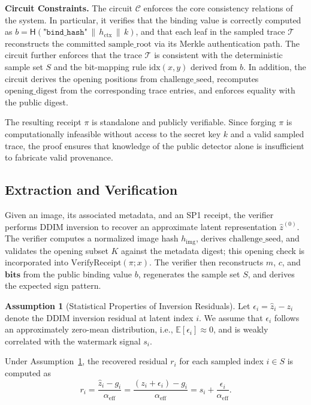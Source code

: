 \documentclass{article}
\theoremstyle{plain}
\theoremstyle{definition}
\newtheorem{assumption}[theorem]{Assumption}
\theoremstyle{remark}
\begin{document}
\textbf{Circuit Constraints.}
The circuit \(\mathcal{C}\) enforces the core consistency relations of the system. In
particular, it verifies that the binding value is correctly computed as
\(b = \mathsf{H}(\texttt{"bind\_hash"} \,\|\, h_{\mathrm{ctx}} \,\|\, k)\), and that each
leaf in the sampled trace \(\mathcal{T}\) reconstructs the committed
\(\mathrm{sample\_root}\) via its Merkle authentication path. The circuit further enforces
that the trace \(\mathcal{T}\) is consistent with the deterministic sample set \(S\) and the
bit-mapping rule \(\mathrm{idx}(x,y)\) derived from \(b\). In addition, the circuit derives the opening positions from \(\mathrm{challenge\_seed}\), recomputes \(\mathrm{opening\_digest}\) from the corresponding trace entries, and enforces equality with the public digest.

The resulting receipt \(\pi\) is standalone and publicly verifiable. Since forging \(\pi\) is computationally infeasible without access to the secret key \(k\) and a valid sampled trace, the proof ensures that knowledge of the public detector alone is insufficient to fabricate valid provenance.

\subsection{Extraction and Verification}
Given an image, its associated metadata, and an SP1 receipt, the verifier performs DDIM
inversion to recover an approximate latent representation \(\hat{z}^{(0)}\). The verifier
computes a normalized image hash \(h_{\mathrm{img}}\), derives
\(\mathrm{challenge\_seed}\), and validates the opening subset \(K\) against the metadata
digest; this opening check is incorporated into
\(\text{VerifyReceipt}(\pi; x)\). The verifier then reconstructs \(m\), \(c\), and
\(\mathbf{bits}\) from the public binding value \(b\), regenerates the sample set \(S\), and
derives the expected sign pattern.

\begin{assumption}[Statistical Properties of Inversion Residuals]
\label{assum:noise}
Let \(\epsilon_i = \hat{z}_i - z_i\) denote the DDIM inversion residual at latent index \(i\).
We assume that \(\epsilon_i\) follows an approximately zero-mean distribution, i.e.,
\(\mathbb{E}[\epsilon_i] \approx 0\), and is weakly correlated with the watermark signal
\(s_i\).
\end{assumption}

Under Assumption~\ref{assum:noise}, the recovered residual \(r_i\) for each sampled index
\(i \in S\) is computed as
\begin{equation}
r_i
= \frac{\hat{z}_i - g_i}{\alpha_{\mathrm{eff}}}
= \frac{(z_i + \epsilon_i) - g_i}{\alpha_{\mathrm{eff}}}
= s_i + \frac{\epsilon_i}{\alpha_{\mathrm{eff}}}.
\label{eq:residual}
\end{equation}
\end{document}
